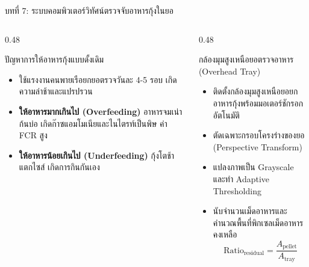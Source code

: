 \documentclass[aspectratio=169, 10pt]{beamer}
\begin{document}
\begin{frame}{บทที่ 7: ระบบคอมพิวเตอร์วิทัศน์ตรวจจับอาหารกุ้งในยอ}
\begin{columns}[T]
    \begin{column}{0.48\textwidth}
        \begin{mastercard}{ปัญหาการให้อาหารกุ้งแบบดั้งเดิม}
            \begin{itemize}
                \item ใช้แรงงานคนพายเรือยกยอตรวจวันละ 4-5 รอบ เกิดความล่าช้าและแปรปรวน
                \item \textbf{ให้อาหารมากเกินไป (Overfeeding)} อาหารจมเน่าก้นบ่อ เกิดก๊าซแอมโมเนียและไนไตรท์เป็นพิษ ค่า FCR สูง
                \item \textbf{ให้อาหารน้อยเกินไป (Underfeeding)} กุ้งโตช้า แตกไซส์ เกิดการกินกันเอง
            \end{itemize}
        \end{mastercard}
    \end{column}
    \begin{column}{0.48\textwidth}
        \begin{aquacard}{กล้องมุมสูงเหนือยอตรวจอาหาร (Overhead Tray)}
            \begin{itemize}
                \item ติดตั้งกล้องมุมสูงเหนือยอยกอาหารกุ้งพร้อมมอเตอร์ชักรอกอัตโนมัติ
                \item ตัดเฉพาะกรอบโครงร่างของยอ (Perspective Transform)
                \item แปลงภาพเป็น Grayscale และทำ Adaptive Thresholding
                \item นับจำนวนเม็ดอาหารและคำนวณพื้นที่พิกเซลเม็ดอาหารคงเหลือ
                \begin{equation*}
                    \text{Ratio}_{\text{residual}} = \frac{A_{\text{pellet}}}{A_{\text{tray}}}
                \end{equation*}
            \end{itemize}
        \end{aquacard}
    \end{column}
\end{columns}
\end{frame}
\end{document}
